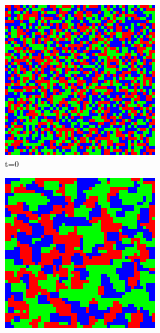 \documentclass[a4paper, 11pt]{article}
\begin{document}
\begin{landscape}
\begin{figure}[H]
\centering
\begin{subfigure}{.20\textwidth}
  \centering
  \includegraphics[width=0.95\linewidth]{ROCK_PAPER_SCISSORS_MOORE_50x50_t00}
  \caption{t=0}
\end{subfigure}%
\begin{subfigure}{.20\textwidth}
  \centering
  \includegraphics[width=0.95\linewidth]{ROCK_PAPER_SCISSORS_MOORE_50x50_t01}

\end{subfigure}
\end{figure}
\end{landscape}
\end{document}
